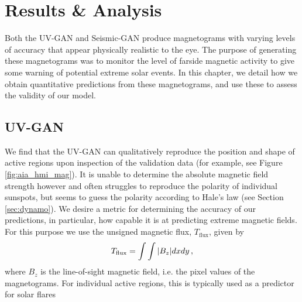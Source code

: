 \documentclass[11pt,a4paper,onecolumn]{report}
\begin{document}
%
%
%
%
%
%
%
\chapter{Results \& Analysis}
%
%
%
%
%
%
\label{chap:results_and_analysis}

Both the UV-GAN and Seismic-GAN produce magnetograms with varying levels of
accuracy that appear physically realistic to the eye. The purpose of generating
these magnetograms was to monitor the level of farside magnetic activity to give
some warning of potential extreme solar events. In this chapter, we detail how
we obtain quantitative predictions from these magnetograms, and use these to
assess the validity of our model. 

\section{UV-GAN}
We find that the UV-GAN can qualitatively reproduce the position and shape of
active regions upon inspection of the validation data (for example, see Figure
\ref{fig:aia_hmi_mag}). It is unable to determine the absolute magnetic field
strength however and often struggles to reproduce the polarity of individual
sunspots, but seems to guess the polarity according to Hale's law (see Section
\ref{sec:dynamo}).
We desire a metric for determining the accuracy of our predictions, in
particular, how capable it is at predicting extreme magnetic fields. 
For this purpose we use the unsigned magnetic flux,
\(T_{\text{flux}}\), given by
\begin{align}
  T_{\text{flux}} = \int \int \absolutevalue{B_z} dx dy \, ,
\end{align}
where \(B_z\) is the line-of-sight magnetic field, i.e. the pixel values of the
magnetograms. For individual active regions, this is typically used as a
predictor for solar flares
\end{document}
